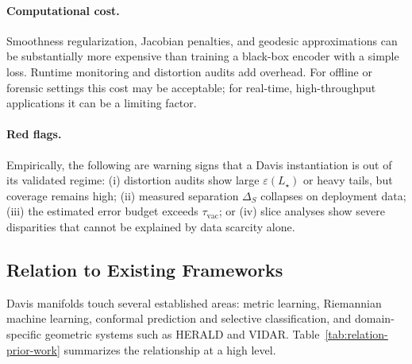 \documentclass[11pt]{article}
\begin{document}
\paragraph{Computational cost.}
Smoothness regularization, Jacobian penalties, and geodesic approximations can be substantially
more expensive than training a black-box encoder with a simple loss. Runtime monitoring and
distortion audits add overhead. For offline or forensic settings this cost may be acceptable; for
real-time, high-throughput applications it can be a limiting factor.

\paragraph{Red flags.}
Empirically, the following are warning signs that a Davis instantiation is out of its validated regime:
(i) distortion audits show large $\varepsilon(L_\star)$ or heavy tails, but coverage remains high;
(ii) measured separation $\Delta_S$ collapses on deployment data; (iii) the estimated error budget
exceeds $\tau_{\mathrm{vac}}$; or (iv) slice analyses show severe disparities that cannot be explained by
data scarcity alone.

\subsection{Relation to Existing Frameworks}

Davis manifolds touch several established areas: metric learning, Riemannian machine learning,
conformal prediction and selective classification, and domain-specific geometric systems such as
HERALD and VIDAR. Table~\ref{tab:relation-prior-work} summarizes the relationship at a high
level.
\end{document}
